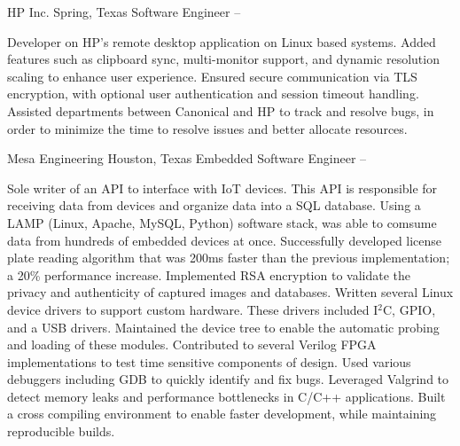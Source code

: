 \documentclass[letterpaper,MMMyyyy,nonstopmode]{simpleresumecv}
\begin{document}
\begin{Body}
    \vspace{3mm}

    \SubSection
    {HP Inc.}
    {Spring, Texas}
    {Software Engineer}
    { -- }

    \begin{Detail}
        \BulletItem
        Developer on HP's remote desktop application on Linux based systems. Added features such as clipboard sync, multi-monitor support, and dynamic resolution scaling to enhance user experience.
        \vspace{2mm}
        \BulletItem
        Ensured secure communication via TLS encryption, with optional user authentication and session timeout handling.
        \vspace{2mm}
        \BulletItem
        Assisted departments between Canonical and HP to track and resolve bugs, in order to minimize the time to resolve issues and better allocate resources.
        \vspace{2mm}

    \end{Detail}
    \vspace{3mm}

    \SubSection
    {Mesa Engineering}
    {Houston, Texas}
    {Embedded Software Engineer}
    { -- }

    \begin{Detail}
        \BulletItem
        Sole writer of an API to interface with IoT devices. This API is responsible for receiving data from devices and organize data into a SQL database. Using a LAMP (Linux, Apache, MySQL, Python) software stack, was able to comsume data from hundreds of embedded devices at once.
        \vspace{2mm}
        \BulletItem
        Successfully developed license plate reading algorithm that was 200ms faster than the previous implementation; a 20\% performance increase.
        \vspace{2mm}
        \BulletItem
        Implemented RSA encryption to validate the privacy and authenticity of captured images and databases.
        \vspace{2mm}
        \BulletItem
        Written several Linux device drivers to support custom hardware. These drivers included I$^2$C, GPIO, and a USB drivers. Maintained the device tree to enable the automatic probing and loading of these modules.
        \vspace{2mm}
        \BulletItem
        Contributed to several Verilog FPGA implementations to test time sensitive components of design.
        \vspace{2mm}
        \BulletItem
        Used various debuggers including GDB to quickly identify and fix bugs. Leveraged Valgrind to detect memory leaks and performance bottlenecks in C/C++ applications.
        \vspace{2mm}
        \BulletItem
        Built a cross compiling environment to enable faster development, while maintaining reproducible builds.
        \vspace{2mm}
    \end{Detail}


\end{Body}
\end{document}
